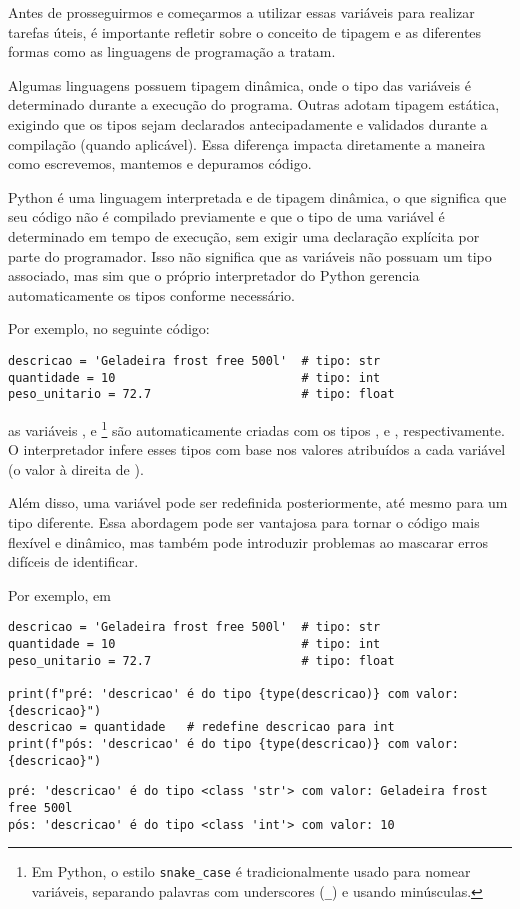Antes de prosseguirmos e começarmos a utilizar essas variáveis para realizar tarefas úteis, é importante refletir
sobre o conceito de tipagem e as diferentes formas como as linguagens de programação a tratam.

Algumas linguagens possuem tipagem dinâmica, onde o tipo das variáveis é determinado durante a execução do programa.
Outras adotam tipagem estática, exigindo que os tipos sejam declarados antecipadamente e validados durante a compilação
(quando aplicável).
Essa diferença impacta diretamente a maneira como escrevemos, mantemos e depuramos código.

Python é uma linguagem interpretada e de tipagem dinâmica, o que significa que seu código não é compilado previamente
e que o tipo de uma variável é determinado em tempo de execução, sem exigir uma declaração explícita por parte do
programador.
Isso não significa que as variáveis não possuam um tipo associado, mas sim que o próprio interpretador do Python
gerencia automaticamente os tipos conforme necessário.


Por exemplo, no seguinte código:
\begin{verbatim}
descricao = 'Geladeira frost free 500l'  # tipo: str
quantidade = 10                          # tipo: int
peso_unitario = 72.7                     # tipo: float
\end{verbatim}

as variáveis ,  e
\footnote{Em Python, o estilo \texttt{snake\_case} é tradicionalmente usado para nomear variáveis,
separando palavras com underscores (\texttt{\_}) e usando minúsculas.}
são automaticamente criadas com os tipos
,  e , respectivamente.
O interpretador infere esses tipos com base nos valores atribuídos a cada variável
(o valor à direita de \inlcode{=}).

Além disso, uma variável pode ser redefinida posteriormente, até mesmo para um tipo diferente.
Essa abordagem pode ser vantajosa para tornar o código mais flexível e dinâmico, mas também pode introduzir problemas ao
mascarar erros difíceis de identificar.

Por exemplo, em
\begin{verbatim}
descricao = 'Geladeira frost free 500l'  # tipo: str
quantidade = 10                          # tipo: int
peso_unitario = 72.7                     # tipo: float

print(f"pré: 'descricao' é do tipo {type(descricao)} com valor: {descricao}")
descricao = quantidade   # redefine descricao para int
print(f"pós: 'descricao' é do tipo {type(descricao)} com valor: {descricao}")
\end{verbatim}
\begin{verbatim}
pré: 'descricao' é do tipo <class 'str'> com valor: Geladeira frost free 500l
pós: 'descricao' é do tipo <class 'int'> com valor: 10
\end{verbatim}

